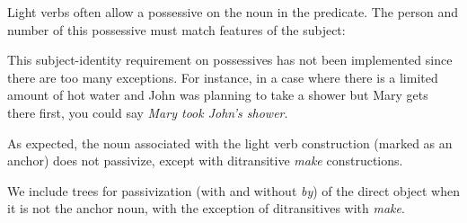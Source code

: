 Light verbs often allow a possessive on the noun in the predicate.  The
person and number of this possessive must match features of the subject:



This subject-identity requirement on possessives has not been implemented
since there are too many exceptions.  For instance, in a case where there
is a limited amount of hot water and John was planning to take a shower but
Mary gets there first, you could say {\it Mary took John's shower}.

\vspace{0.5in}  \vspace{0.25in}

As expected, the noun associated with the light verb construction (marked
as an anchor) does not passivize, except with ditransitive {\it make}
constructions.





We include trees for passivization (with and without {\it by}) of the
direct object when it is not the anchor noun, with the exception of
ditransitives with {\it make}.









